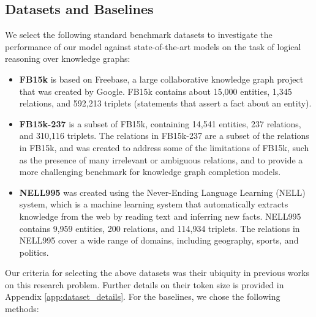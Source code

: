 \documentclass{article} %
\begin{document}
\subsection{Datasets and Baselines}
We select the following standard benchmark datasets to investigate the performance of our model against state-of-the-art models on the task of logical reasoning over knowledge graphs:
\begin{itemize}[noitemsep,leftmargin=*]
    \item \textbf{FB15k} \citep{bollacker2008freebase} is based on Freebase, a large collaborative knowledge graph project that was created by Google. FB15k contains about 15,000 entities, 1,345 relations, and 592,213 triplets (statements that assert a fact about an entity).
    \item \textbf{FB15k-237} \citep{toutanova2015representing} is a subset of FB15k, containing 14,541 entities, 237 relations, and 310,116 triplets. The relations in FB15k-237 are a subset of the relations in FB15k, and was created to address some of the limitations of FB15k, such as the presence of many irrelevant or ambiguous relations, and to provide a more challenging benchmark for knowledge graph completion models.
    \item \textbf{NELL995} \citep{carlson2010toward} was created using the Never-Ending Language Learning (NELL) system, which is a machine learning system that automatically extracts knowledge from the web by reading text and inferring new facts. NELL995 contains 9,959 entities, 200 relations, and 114,934 triplets. The relations in NELL995 cover a wide range of domains, including geography, sports, and politics.
\end{itemize}
Our criteria for selecting the above datasets was their ubiquity in previous works on this research problem. Further details on their token size is provided in Appendix \ref{app:dataset_details}. For the baselines, we chose the following methods:
\end{document}
